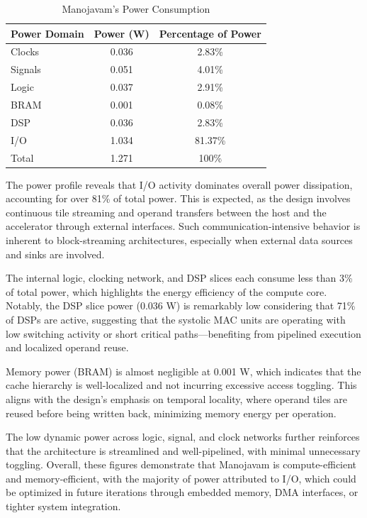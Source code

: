 \begin{table}[htb]
	\centering
	\fontsize{10}{12}\selectfont
	\caption{Manojavam's Power Consumption}
	\label{tab:manojavam-power-consumption}
	\begin{tabular}{|p{3cm}|c|c|}
		\hline
		\textbf{Power Domain}& \textbf {Power (W)} & \textbf {Percentage of Power}\\
		\hline
		Clocks & 0.036 & 2.83\%\\\hline
		Signals & 0.051 & 4.01\%\\\hline
		Logic & 0.037 & 2.91\%\\\hline
		BRAM & 0.001 & 0.08\%\\\hline
		DSP & 0.036 & 2.83\%\\\hline
		I/O & 1.034 & 81.37\%\\\hline
		Total & 1.271 & 100\%\\\hline
	\end{tabular}
\end{table}

The power profile reveals that I/O activity dominates overall power dissipation, accounting for over 81\% of total power. This is expected, as the design involves continuous tile streaming and operand transfers between the host and the accelerator through external interfaces. Such communication-intensive behavior is inherent to block-streaming architectures, especially when external data sources and sinks are involved.

The internal logic, clocking network, and DSP slices each consume less than 3\% of total power, which highlights the energy efficiency of the compute core. Notably, the DSP slice power (0.036 W) is remarkably low considering that 71\% of DSPs are active, suggesting that the systolic MAC units are operating with low switching activity or short critical paths—benefiting from pipelined execution and localized operand reuse.

Memory power (BRAM) is almost negligible at 0.001 W, which indicates that the cache hierarchy is well-localized and not incurring excessive access toggling. This aligns with the design’s emphasis on temporal locality, where operand tiles are reused before being written back, minimizing memory energy per operation.

The low dynamic power across logic, signal, and clock networks further reinforces that the architecture is streamlined and well-pipelined, with minimal unnecessary toggling. Overall, these figures demonstrate that Manojavam is compute-efficient and memory-efficient, with the majority of power attributed to I/O, which could be optimized in future iterations through embedded memory, DMA interfaces, or tighter system integration.

